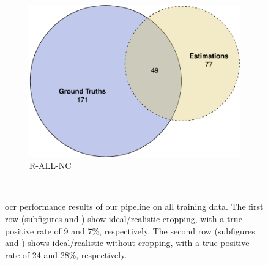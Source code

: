 \begin{figure}[h]
\begin{subfigure}[b]{0.475\textwidth}
    \includegraphics[width=\textwidth]{images/evaluation/ocr_overlap_r_all_nc}
    \caption{R-ALL-NC}
    \label{fig:evaluation:results:ocr:r_all_nc}
  \end{subfigure}
  \hspace{\fill} 
  \bigskip
  \\
  \caption[OCR performance results]{\gls{ocr} performance results of our pipeline on all training data. The first row (subfigures  and ) show ideal/realistic cropping, with a true positive rate of 9 and 7\%, respectively. The second row (subfigures  and ) shows ideal/realistic without cropping, with a true positive rate of 24 and 28\%, respectively.}
  \label{fig:evaluation:results:ocr}
\end{figure}